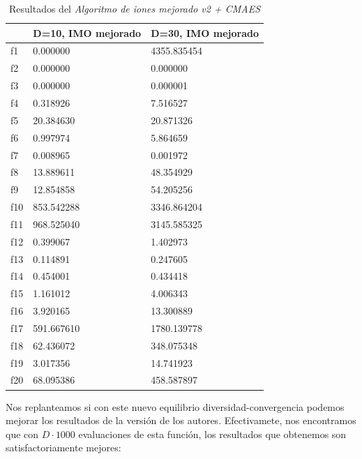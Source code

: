 \documentclass[a4paper,11pt]{article}
\begin{document}
\begin{itemize}
  \begin{table}[H]	
  \caption{Resultados del \textit{Algoritmo de iones mejorado v2 + CMAES}}
  \centering
  \begin{tabular}{|l|l|l|}
  \hline
  & \textbf{D=10, IMO mejorado} & \textbf{D=30, IMO mejorado} \\ \hline
  f1 &  0.000000 &  4355.835454 \\ \hline
  f2 &  0.000000 &  0.000000 \\ \hline
  f3 &  0.000000 &  0.000001 \\ \hline
  f4 &  0.318926 &  7.516527 \\ \hline
  f5 &  20.384630 &  20.871326 \\ \hline
  f6 &  0.997974 &  5.864659 \\ \hline
  f7 &  0.008965 &  0.001972 \\ \hline
  f8 &  13.889611 &  48.354929 \\ \hline
  f9 &  12.854858 &  54.205256 \\ \hline
  f10 &  853.542288 &  3346.864204 \\ \hline
  f11 &  968.525040 &  3145.585325 \\ \hline
  f12 &  0.399067 &  1.402973 \\ \hline
  f13 &  0.114891 &  0.247605 \\ \hline
  f14 &  0.454001 &  0.434418 \\ \hline
  f15 &  1.161012 &  4.006343 \\ \hline
  f16 &  3.920165 &  13.300889 \\ \hline
  f17 &  591.667610 &  1780.139778 \\ \hline
  f18 &  62.436072 &  348.075348 \\ \hline
  f19 &  3.017356 &  14.741923 \\ \hline
  f20 &  68.095386 &  458.587897 \\ \hline
  \end{tabular}
  \label{mejv2}
  \end{table}
  
  Nos replanteamos si con este nuevo equilibrio diversidad-convergencia podemos mejorar los resultados de la versión de los autores.
  Efectivamete, nos encontramos que con $D\cdot 1000$ evaluaciones de esta función, los resultados que obtenemos son satisfactoriamente
  mejores:
  

\end{itemize}
\end{document}

